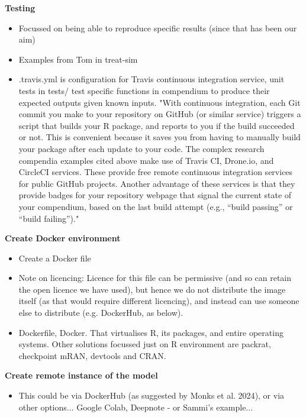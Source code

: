 \textbf{Testing}
\begin{itemize}
    \item Focussed on being able to reproduce specific results (since that has been our aim)
    \item Examples from Tom in treat-sim
    \item .travis.yml is configuration for Travis continuous integration service, unit tests in tests/ test specific functions in compendium to produce their expected outputs given known inputs. "With continuous integration, each Git commit you make to your repository on GitHub (or similar service) triggers a script that builds your R package, and reports to you if the build succeeded or not. This is convenient because it saves you from having to manually build your package after each update to your code. The complex research compendia examples cited above make use of Travis CI, Drone.io, and CircleCI services. These provide free remote continuous integration services for public GitHub projects. Another advantage of these services is that they provide badges for your repository webpage that signal the current state of your compendium, based on the last build attempt (e.g., “build passing” or “build failing”)." \autocite{marwick_packaging_2018}
\end{itemize}

\textbf{Create Docker environment}
\begin{itemize}
    \item Create a Docker file
    \item Note on licencing: Licence for this file can be permissive (and so can retain the open licence we have used), but hence we do not distribute the image itself (as that would require different licencing), and instead can use someone else to distribute (e.g. DockerHub, as below).\autocite{the_linux_foundation_docker_nodate}
    \item Dockerfile, Docker. That virtualises R, its packages, and entire operating systems. Other solutions focussed just on R environment are packrat, checkpoint mRAN, devtools and CRAN. \autocite{marwick_packaging_2018}
\end{itemize}

\textbf{Create remote instance of the model}
\begin{itemize}
    \item This could be via DockerHub (as suggested by Monks et al. 2024\autocite{monks_towards_2024}), or via other options... Google Colab, Deepnote - or Sammi's example...
\end{itemize}

